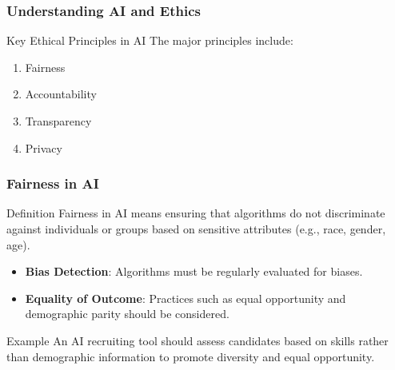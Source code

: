 \documentclass{beamer}
\begin{document}
\begin{frame}[fragile]
    \frametitle{Understanding AI and Ethics}
    \begin{block}{Key Ethical Principles in AI}
        The major principles include:
        \begin{enumerate}
            \item Fairness
            \item Accountability
            \item Transparency
            \item Privacy
        \end{enumerate}
    \end{block}
\end{frame}

\begin{frame}[fragile]
    \frametitle{Fairness in AI}
    \begin{block}{Definition}
        Fairness in AI means ensuring that algorithms do not discriminate against individuals or groups based on sensitive attributes (e.g., race, gender, age).
    \end{block}
    
    \begin{itemize}
        \item \textbf{Bias Detection}: Algorithms must be regularly evaluated for biases.
        \item \textbf{Equality of Outcome}: Practices such as equal opportunity and demographic parity should be considered.
    \end{itemize}
    
    \begin{block}{Example}
        An AI recruiting tool should assess candidates based on skills rather than demographic information to promote diversity and equal opportunity.
    \end{block}
\end{frame}
\end{document}
